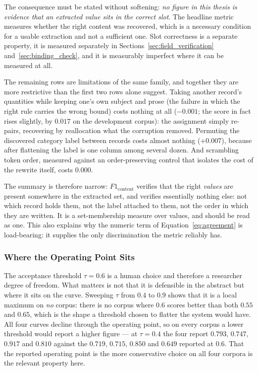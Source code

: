 \documentclass[11pt]{article}
\begin{document}
The consequence must be stated without softening: \emph{no figure in this
thesis is evidence that an extracted value sits in the correct slot}. The
headline metric measures whether the right content was recovered, which is a
necessary condition for a usable extraction and not a sufficient one. Slot
correctness is a separate property, it is measured separately in
Sections~\ref{sec:field_verification} and~\ref{sec:binding_check}, and it is
measurably imperfect where it can be measured at all.

The remaining rows are limitations of the same family, and together they are
more restrictive than the first two rows alone suggest. Taking another record's
quantities while keeping one's own subject and prose (the failure in which the
right rule carries the wrong bound) costs nothing at all ($-0.001$; the score in
fact rises slightly, by $0.017$ on the development corpus): the assignment
simply re-pairs, recovering by reallocation what the corruption removed.
Permuting the discovered category label between records costs almost nothing
($+0.007$), because after flattening the label is one column among several dozen.
And scrambling token order, measured against an order-preserving control that
isolates the cost of the rewrite itself, costs $0.000$.

The summary is therefore narrow: $F1_{\text{content}}$ verifies that the
right \emph{values} are present somewhere in the extracted set, and verifies
essentially nothing else: not which record holds them, not the label attached
to them, not the order in which they are written. It is a set-membership measure
over values, and should be read as one. This also explains why the numeric term
of Equation~\ref{eq:agreement} is load-bearing: it supplies the only
discrimination the metric reliably has.

\subsubsection{Where the Operating Point Sits}
The acceptance threshold $\tau = 0.6$ is a human choice and therefore a
researcher degree of freedom. What matters is not that it is defensible in the
abstract but where it sits on the curve. Sweeping $\tau$ from $0.4$ to $0.9$
shows that it is a local maximum on \emph{no} corpus: there is no
corpus where $0.6$ scores better than both $0.55$ and $0.65$, which is the shape
a threshold chosen to flatter the system would have. All four curves decline
through the operating point, so on every corpus a lower threshold would report a
higher figure --- at $\tau = 0.4$ the four report $0.793$, $0.747$, $0.917$ and
$0.810$ against the $0.719$, $0.715$, $0.850$ and $0.649$ reported at $0.6$.
That the reported operating point is the more conservative choice on all four
corpora is the relevant property here.
\end{document}
